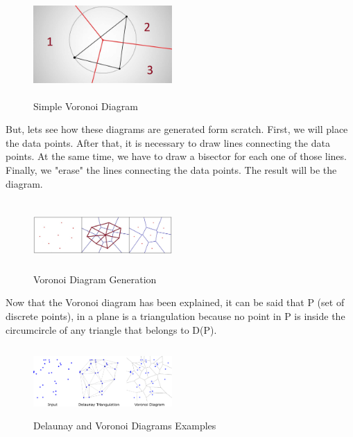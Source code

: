 \documentclass[conference]{IEEEtran}
\begin{document}
\begin{figure}[H]
    \centering
    \includegraphics[width=200,height=150,keepaspectratio]{maxresdefault2.jpg}
    \caption{Simple Voronoi Diagram}
    \label{fig:VoronoiDiagram1}
\end{figure}

But, lets see how these diagrams are generated form scratch. First, we will place the data points. After that, it is necessary to draw lines connecting the data points. At the same time, we have to draw a bisector for each one of those lines. Finally, we "erase" the lines connecting the data points. The result will be the diagram.

\begin{figure}[H]
    \centering
    \includegraphics[width=200px,height=100px,keepaspectratio]{DiagramGeneration.jpg}
    \caption{Voronoi Diagram Generation}
    \label{fig:VoronoiDiagram1}
\end{figure}

Now that the Voronoi diagram has been explained, it can be said that P (set of discrete points), in a plane is a triangulation because no point in P is inside the circumcircle of any triangle that belongs to D(P).

\begin{figure}[H]
    \centering
    \includegraphics[width=200px,height=100px,keepaspectratio]{Delaunay&VoronoiDiagrams.png}
    \caption{Delaunay and Voronoi Diagrams Examples}
    \label{fig:Delaunay&Voronoi}
\end{figure}
\end{document}
